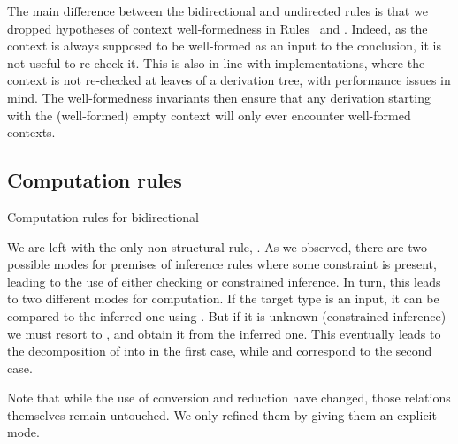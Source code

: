 The main difference between the bidirectional and undirected rules is that we dropped
hypotheses of context well-formedness in Rules~ and
. Indeed, as the context is always supposed to be well-formed
as an input to the conclusion, it is not useful to re-check it. This is also in line with implementations, where the context is not re-checked at leaves of a derivation tree, with performance issues in mind. The well-formedness invariants then ensure that any derivation starting with the (well-formed) empty context will only ever encounter well-formed contexts.

\subsection{Computation rules}

\begin{marginfigure}
\ContinuedFloat
{}
\caption{Computation rules for bidirectional }
\end{marginfigure}

We are left with the only non-structural rule, .
As we observed, there are two possible modes for premises of inference rules where some
constraint is present, leading to the use of either checking or constrained inference.
In turn, this leads to two different modes for computation.
If the target type is an input, it can be compared to the inferred one using .
But if it is unknown (constrained inference) we must resort to ,
and obtain it from the inferred one.
This eventually leads to the decomposition of  into
 in the first case, while
 and  correspond to the second case.

Note that while the use of conversion and reduction have changed, those relations themselves
remain untouched. We only refined them by giving them an explicit mode.

